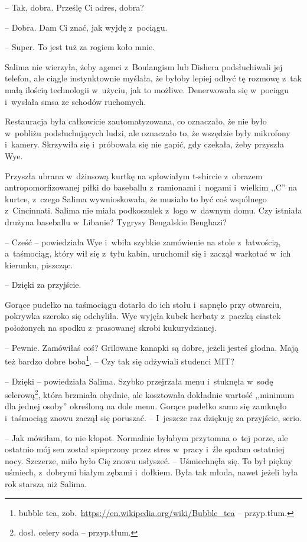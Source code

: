 \documentclass[oneside,polish,11pt,sfheadings]{mwbk}
\begin{document}
-- Tak, dobra. Prześlę Ci adres, dobra?

-- Dobra. Dam Ci znać, jak wyjdę z~pociągu.

-- Super. To jest tuż za rogiem koło mnie.

Salima nie wierzyła, żeby agenci z~Boulangism lub Dishera podsłuchiwali
jej telefon, ale ciągle instynktownie myślała, że byłoby lepiej odbyć tę
rozmowę z~tak małą ilością technologii w~użyciu, jak to możliwe.
Denerwowała się w~pociągu i~wysłała smsa ze schodów ruchomych.

Restauracja była całkowicie zautomatyzowana, co oznaczało, że nie było w~pobliżu podsłuchujących ludzi, ale oznaczało to, że wszędzie były
mikrofony i~kamery. Skrzywiła się i~próbowała się nie gapić, gdy
czekała, żeby przyszła Wye.

Przyszła ubrana w~dżinsową kurtkę na spłowiałym t-shircie z~obrazem
antropomorfizowanej piłki do baseballu z~ramionami i~nogami i~wielkim
,,C'' na kurtce, z~czego Salima wywnioskowała, że musiało to być coś
wspólnego z~Cincinnati. Salima nie miała podkoszulek z~logo w~dawnym
domu. Czy istniała drużyna baseballu w~Libanie? Tygrysy Bengalskie
Benghazi?

-- Cześć -- powiedziała Wye i~wbiła szybkie zamówienie na stole z~łatwością, a~taśmociąg, który wił się z~tyłu kabin, uruchomił się i~zaczął warkotać w~ich kierunku, piszcząc.

-- Dzięki za przyjście.

Gorące pudełko na taśmociągu dotarło do ich stołu i~sapnęło przy
otwarciu, pokrywka szeroko się odchyliła. Wye wyjęła kubek herbaty z~paczką ciastek położonych na spodku z~prasowanej skrobi kukurydzianej. 

-- Pewnie. Zamówiłaś coś? Grilowane kanapki są dobre, jeżeli jesteś głodna.
Mają też bardzo dobre boba\footnote{ bubble tea,
zob.~\url{https://en.wikipedia.org/wiki/Bubble\_tea} -- przyp.tłum.}. -- Czy tak się odżywiali studenci MIT?

-- Dzięki -- powiedziała Salima. Szybko przejrzała menu i~stuknęła w~sodę
selerową\footnote{ dosł. celery soda -- przyp.tłum.}, która brzmiała ohydnie,
ale kosztowała dokładnie wartość ,,minimum dla jednej osoby'' określoną
na dole menu. Gorące pudełko samo się zamknęło i~taśmociąg znowu zaczął
się poruszać. -- I~jeszcze raz dziękuję za przyjście, serio.

-- Jak mówiłam, to nie kłopot. Normalnie byłabym przytomna o~tej porze,
ale ostatnio mój sen został spieprzony przez stres w~pracy i~źle spałam
ostatniej nocy. Szczerze, miło było Cię znowu usłyszeć. -- Uśmiechnęła
się. To był piękny uśmiech, z~dobrymi białym zębami i~dołkiem. Była tak
młoda, nawet jeżeli była rok starsza niż Salima.
\end{document}
